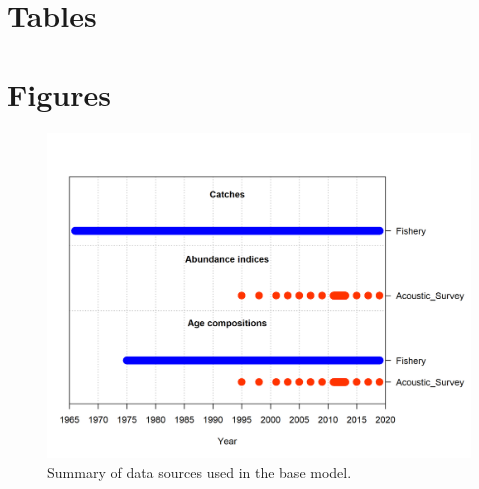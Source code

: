 \documentclass[11pt,
  english,
  letterpaper,
]{article}
\begin{document}
\clearpage

\hypertarget{tables}{%
\section{Tables}\label{tables}}

\clearpage

\hypertarget{figures}{%
\section{Figures}\label{figures}}

\begin{figure}
\centering
\includegraphics[width=1\textwidth,height=1\textheight]{data-plot.png}
\caption{Summary of data sources used in the base model.\label{fig:data-plot}}
\end{figure}
\end{document}
